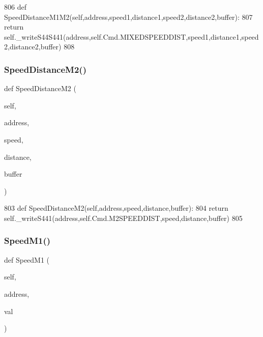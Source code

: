 \begin{DoxyCode}
806     \textcolor{keyword}{def }SpeedDistanceM1M2(self,address,speed1,distance1,speed2,distance2,buffer):
807         \textcolor{keywordflow}{return} self.\_writeS44S441(address,self.Cmd.MIXEDSPEEDDIST,speed1,distance1,speed2,distance2,buffer)
808 
\end{DoxyCode}
\mbox{\label{classtoxic__hardware_1_1roboclaw__3_1_1Roboclaw_a6469781a5630e53aa70f19cf603cfcc0}} 
\subsubsection{\texorpdfstring{Speed\+Distance\+M2()}{SpeedDistanceM2()}}
{\footnotesize\ttfamily def Speed\+Distance\+M2 (\begin{DoxyParamCaption}\item[{}]{self,  }\item[{}]{address,  }\item[{}]{speed,  }\item[{}]{distance,  }\item[{}]{buffer }\end{DoxyParamCaption})}


\begin{DoxyCode}
803     \textcolor{keyword}{def }SpeedDistanceM2(self,address,speed,distance,buffer):
804         \textcolor{keywordflow}{return} self.\_writeS441(address,self.Cmd.M2SPEEDDIST,speed,distance,buffer)
805 
\end{DoxyCode}
\mbox{\label{classtoxic__hardware_1_1roboclaw__3_1_1Roboclaw_af4f6babccd668312895a4a4b04a262d4}} 
\subsubsection{\texorpdfstring{Speed\+M1()}{SpeedM1()}}
{\footnotesize\ttfamily def Speed\+M1 (\begin{DoxyParamCaption}\item[{}]{self,  }\item[{}]{address,  }\item[{}]{val }\end{DoxyParamCaption})}


